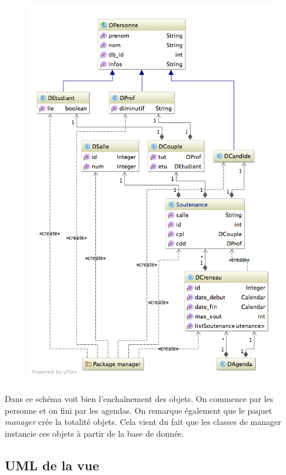 \documentclass[a4paper,10pt]{report}
\begin{document}
			\begin{figure}[h!]
				\includegraphics[scale=.5]{uml_don.png}	
				\centering
			\end{figure}

			\paragraph*{}
			Dans ce schéma voit bien l’enchaînement des objets. On commence par les personne et on fini par les agendas. On remarque également que le paquet \textit{manager} crée la totalité objets. Cela vient du fait que les classes de manager instancie ces objets à partir de la base de donnée.

		\subsection{UML de la vue}
\end{document}
